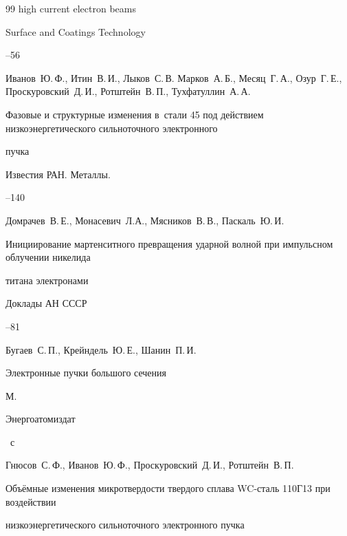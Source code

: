 \begin{thebibliography}{99}
high current electron beams

\jour Surface and Coatings Technology



--56




\by Иванов~Ю.\,Ф., Итин~В.\,И., Лыков~С.\,В. Марков~А.\,Б., Месяц~Г.\,А., Озур~Г.\,Е., Проскуровский~Д.\,И., Ротштейн~В.\,П., Тухфатуллин~А.\,А.

\paper Фазовые и структурные изменения в~стали 45 под действием низкоэнергетического сильноточного электронного

пучка

\jour Известия РАН. Металлы.



--140






\by  Домрачев~В.\,Е., Монасевич~Л.А., Мясников~В.\,В., Паскаль~Ю.\,И.

\paper Инициирование мартенситного превращения ударной волной при импульсном облучении никелида

титана электронами

\jour Доклады АН СССР




--81




\by  Бугаев~С.\,П., Крейндель~Ю.\,Е., Шанин~П.\,И.

\book Электронные пучки большого сечения

\publaddr М.

\publ Энергоатомиздат


~с




\by Гнюсов~С.\,Ф., Иванов~Ю.\,Ф., Проскуровский~Д.\,И., Ротштейн~В.\,П.

\paper Объёмные изменения микротвердости твердого сплава WC-сталь 110Г13 при воздействии

низкоэнергетического сильноточного электронного пучка


\end{thebibliography}

